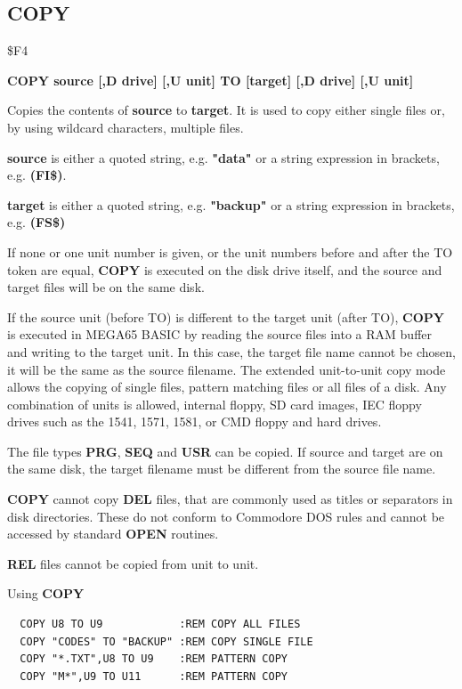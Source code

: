\subsection{COPY}
\begin{description}[leftmargin=2cm,style=nextline]
\item [Token:] \$F4
\item [Format:] {\bf COPY source [,D drive] [,U unit] TO
                [target] [,D drive] [,U unit] }
\item [Usage:]
   Copies the contents of
   {\bf source} to {\bf target}.
   It is used to copy either single files or, by using
   wildcard characters, multiple files.

   {\bf source} is either a quoted string, e.g. {\bf "data"} or
   a string expression in brackets, e.g. {\bf (FI\$)}.

   {\bf target} is either a quoted string, e.g. {\bf "backup"} or
   a string expression in brackets, e.g. {\bf (FS\$)}

   \drivedefinition

   \unitdefinition

   If none or one unit number is given, or the unit numbers before and after
   the TO token are equal, {\bf COPY} is executed on the disk drive
   itself, and the source and target files will be on the same disk.

   If the source unit (before TO) is different to the target unit (after TO),
   {\bf COPY} is executed in MEGA65 BASIC by reading the source
   files into a RAM buffer and writing to the target unit. In this case,
   the target file name cannot be chosen, it will be the same as the
   source filename. The extended unit-to-unit copy mode allows the copying of
   single files, pattern matching files or all files of a disk.
   Any combination of units is allowed, internal floppy, SD card images,
   IEC floppy drives such as the 1541, 1571, 1581, or CMD floppy and hard drives.

\item [Remarks:]
   The file types {\bf PRG}, {\bf SEQ} and {\bf USR} can be copied.
   If source and target are on the same disk, the target filename
   must be different from the source file name.

   {\bf COPY} cannot copy {\bf DEL} files, that are commonly used
   as titles or separators in disk directories. These do not conform to
   Commodore DOS rules and cannot be accessed by standard {\bf OPEN} routines.

   {\bf REL} files cannot be copied from unit to unit.

\item [Examples:] Using {\bf COPY}
\begin{tcolorbox}[colback=black,coltext=white]
\verbatimfont{\codefont}
\begin{verbatim}
  COPY U8 TO U9            :REM COPY ALL FILES
  COPY "CODES" TO "BACKUP" :REM COPY SINGLE FILE
  COPY "*.TXT",U8 TO U9    :REM PATTERN COPY
  COPY "M*",U9 TO U11      :REM PATTERN COPY
\end{verbatim}
\end{tcolorbox}
\end{description}

